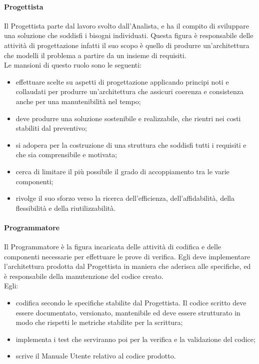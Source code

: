             \paragraph{Progettista }
                Il Progettista parte dal lavoro svolto dall’Analista, e ha il compito di sviluppare una soluzione che soddisfi i bisogni individuati. Questa figura è responsabile delle attività di progettazione infatti il suo scopo è quello di produrre un’architettura che modelli il problema a partire da un insieme di requisiti. \\
                Le mansioni di questo ruolo sono le seguenti:\\
                \begin{itemize}
                    \item effettuare scelte su aspetti di progettazione applicando principi noti e collaudati per produrre un’architettura che assicuri coerenza e consistenza anche per una manutenibilità nel tempo;
                    \item deve produrre una soluzione sostenibile e realizzabile, che rientri nei costi stabiliti dal preventivo;
                    \item si adopera per la costruzione di una struttura che soddisfi tutti i requisiti e che sia comprensibile e motivata;
                    \item cerca di limitare il più possibile il grado di accoppiamento tra le varie componenti;
                    \item rivolge il suo sforzo verso la ricerca dell’efficienza, dell’affidabilità, della flessibilità e della riutilizzabilità.
                \end{itemize}
            \paragraph{Programmatore }
                Il Programmatore è la figura incaricata delle attività di codifica e delle componenti necessarie per effettuare le prove di verifica. Egli deve implementare l’architettura prodotta dal Progettista in maniera che aderisca alle specifiche, ed è responsabile della manutenzione del codice creato. \\
                Egli:
                \begin{itemize}
                    \item codifica secondo le specifiche stabilite dal Progettista. Il codice scritto deve essere documentato, versionato, mantenibile ed deve essere strutturato in modo che rispetti le metriche stabilite per la scrittura;
                    \item implementa i test che serviranno poi per la verifica e la validazione del codice;
                    \item scrive il Manuale Utente relativo al codice prodotto.
                \end{itemize}
